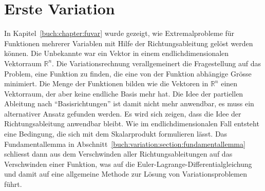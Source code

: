 %
%
%
\chapter{Erste Variation
\label{buch:chapter:variation}}
In Kapitel~\ref{buch:chapter:fuvar} wurde gezeigt, wie Extremalprobleme
für Funktionen mehrerer Variablen mit Hilfe der Richtungsableitung
gelöst werden können.
Die Unbekannte war ein Vektor in einem endlichdimensionalen
Vektorraum $\mathbb{R}^n$.
Die Variationsrechnung verallgemeinert die Fragestellung auf das Problem,
eine Funktion zu finden, die eine von der Funktion abhängige Grösse
minimiert.
Die Menge der Funktionen bilden wie die Vektoren in $\mathbb{R}^n$
einen Vektorraum, der aber keine endliche Basis mehr hat.
Die Idee der partiellen Ableitung nach ``Basisrichtungen'' ist
damit nicht mehr anwendbar, es muss ein alternativer Ansatz gefunden
werden.
Es wird sich zeigen, dass die Idee der Richtungsableitung anwendbar
bleibt.
Wie im endlichdimensionalen Fall entsteht eine Bedingung, die sich
mit dem Skalarprodukt formulieren lässt.
Das Fundamentallemma in
Abschnitt~\ref{buch:variation:section:fundamentallemma}
schliesst dann aus dem Verschwinden aller Richtungsableitungen 
auf das Verschwinden einer Funktion, was auf die
Euler-Lagrange-Differentialgleichung und damit auf eine allgemeine
Methode zur Lösung von Variationsproblemen führt.








\uebungsabschnitt

\begin{uebungsaufgaben}
\end{uebungsaufgaben}
\enduebungsabschnitt

